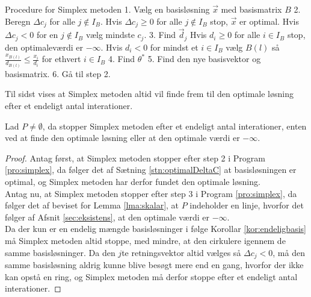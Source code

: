 \begin{pro}[label=pro:simplex,style=ingental]{Procedure for Simplex metoden}
1. Vælg en basisløsning $\vec{x}$ med basismatrix $B$
2. Beregn $\Delta c_j$ for alle $j \notin I_B$. 
   Hvis $\Delta c_j\geq 0$ for alle $j \notin I_B$ 
   	   stop, $\vec{x}$ er optimal.
   Hvis $\Delta c_j < 0$ for en $j \notin I_B$
       vælg mindste $c_j$.
3. Find $\vec{d}_j$
   Hvis $d_i \geq 0 $ for alle $i \in I_B$ 
       stop, den optimaleværdi er $- \infty$.
   Hvis $d_i < 0 $ for mindst et $i \in I_B$ 
       vælg $B(l)$ så $\frac{x_{B(l)}}{d_{B(l)}}\leq \frac{x_i}{d_i} $ for ethvert $i \in I_B$
4. Find $\theta^*$
5. Find den nye basisvektor og basismatrix.
6. Gå til step 2.
\end{pro}

Til sidst vises at Simplex metoden altid vil finde frem til den optimale løsning efter et endeligt antal interationer.
\begin{stn}
Lad $P \neq \emptyset$, da stopper Simplex metoden efter et endeligt antal interationer, enten ved at finde den optimale løsning eller at den optimale værdi er $- \infty$.
\end{stn}
\begin{proof}
Antag først, at Simplex metoden stopper efter step 2 i Program \ref{pro:simplex}, da følger det af Sætning \ref{stn:optimalDeltaC}
at basisløsningen er optimal, og Simplex metoden har derfor fundet den optimale løsning.
\\ Antag nu, at Simplex metoden stopper efter step 3 i Program \ref{pro:simplex}, da følger det af beviset for Lemma \ref{lma:skalar}, at $P$ indeholder en linje, hvorfor det følger af Afsnit \ref{sec:eksistens},
at den optimale værdi er $-\infty$.
\\ Da der kun er en endelig mængde basisløsninger i følge Korollar \ref{kor:endeligbasis}
må Simplex metoden altid stoppe, med mindre, at den cirkulere igennem de samme basisløsninger.
Da den $j$te retningsvektor altid vælges så $\Delta c_j < 0$, må den samme basisløsning aldrig kunne blive besøgt mere end en gang, hvorfor der ikke kan opstå en ring, og Simplex metoden må derfor stoppe efter et endeligt antal interationer.
\end{proof} 





